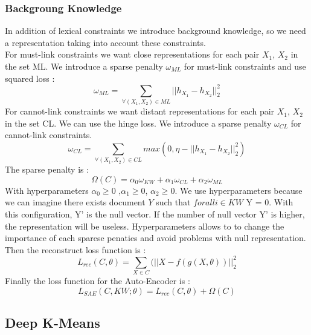 \subsubsection{Backgroung Knowledge}
In addition of lexical constraints we introduce background knowledge, so we need
a representation taking into account these constraints.\\
For must-link constraints we want close representations for each pair $X_1$, $X_2$
in the set ML. We introduce a sparse penalty $\omega_{ML}$ for must-link
constraints and use squared loss :
\begin{equation}\label{eq:omegaML}
  \omega_{ML} = \sum_{\forall{(X_1,X_2)\in ML}} || h_{X_1} - h_{X_2} ||_2^2
\end{equation}
For cannot-link constraints we want distant representations for each pair $X_1$,
$X_2$ in the set CL.
We can use the hinge loss.
We introduce a sparse penalty $\omega_{CL}$ for cannot-link constraints.
\begin{equation}\label{eq:omegaCL}
  \omega_{CL} = \sum_{\forall{(X_1,X_2)\in CL}} max(0,
  \eta - || h_{X_1} - h_{X_2} ||_2^2)
\end{equation}
The sparse penalty is :
\begin{equation}\label{eq:Sparse}
  \Omega(C) = \alpha_0\omega_{KW} + \alpha_1\omega_{CL} + \alpha_2\omega_{ML}  
\end{equation}
With hyperparameters $\alpha_0\geq 0$ ,$\alpha_1\geq 0$, $\alpha_2\geq 0$. We use
hyperparameters because we can imagine there exists document $Y$ such that
$forall i \in KW$ Y = 0. With this configuration, Y' is the null vector. If the
number of null vector Y' is higher, the representation will be useless.
Hyperparameters allows to to change the importance of each sparese penaties
and avoid problems with null representation.\\
Then the reconstruct loss function is :
\begin{equation}\label{eq:AEDK}
  L_{rec}(C, \theta) = \sum_{X \in C}(||X - f(g(X, \theta))||_2^2
\end{equation}
Finally the loss function for the Auto-Encoder is :
\begin{equation}\label{eq:AE}
  L_{SAE}(C,KW; \theta) = L_{rec}(C, \theta) + \Omega(C)  
\end{equation}

\subsection{Deep K-Means}

